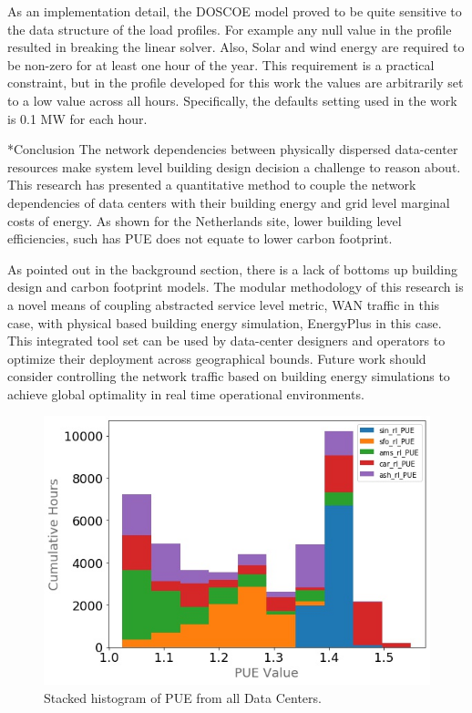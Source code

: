 \documentclass[twocolumn, a4paper,10pt]{article}
\makeatletter
\renewcommand\section{\@startsection{section}{1}{\z@}{3pt}{3pt}{\normalfont\large\bfseries}}
\makeatother
\begin{document}
As an implementation detail, the DOSCOE model proved to be quite sensitive to the data structure of the load profiles. For example any null value in the profile resulted in breaking the linear solver. Also, Solar and wind energy are required to be non-zero for at least one hour of the year. This requirement is a practical constraint, but in the profile developed for this work the values are arbitrarily set to a low value across all hours. Specifically, the defaults setting used in the work is 0.1 MW for each hour. 


\section*{Conclusion}
The network dependencies between physically dispersed data-center resources make system level building design decision a challenge to reason about. This research has presented a quantitative method to couple the network dependencies of data centers with their building energy and grid level marginal costs of energy. As shown for the Netherlands site, lower building level efficiencies, such has PUE does not equate to lower carbon footprint.  

As pointed out in the background section, there is a lack of bottoms up building design and carbon footprint models. The modular methodology of this research is a novel means of coupling abstracted service level metric, WAN traffic in this case, with physical based building energy simulation, EnergyPlus in this case. This integrated tool set can be used by data-center designers and operators to optimize their deployment across geographical bounds. Future work should consider controlling the network traffic based on building energy simulations to achieve global optimality in real time operational environments.  


\begin{figure}
  \centering
  \includegraphics[scale=.40]{img/pue.jpg}
  \caption{Stacked histogram of PUE from all Data Centers.}
  \label{fig:pue}
  \end{figure}


\newpage


\end{document}
